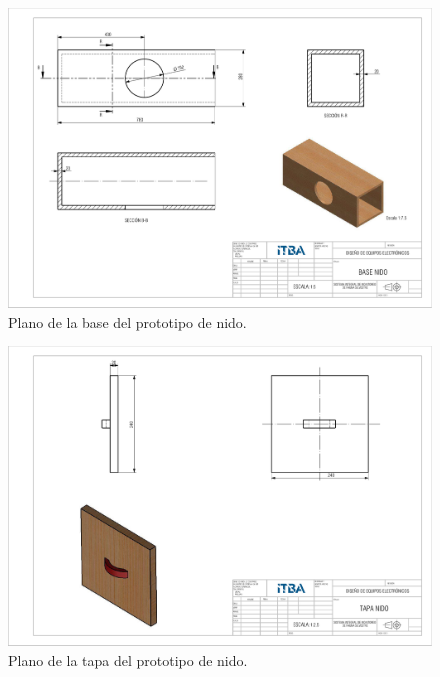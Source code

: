 \begin{figure}[H]
	\centering
	\includegraphics[width=\linewidth]{ImagenesApendice/Base_nido_plano}
	\caption{Plano de la base del prototipo de nido.}
	\label{fig:base_nido_plano}
\end{figure}


\begin{figure}[H]
	\centering
	\includegraphics[width=0.9\linewidth]{ImagenesApendice/tapa_nido_plano}
	\caption{Plano de la tapa del prototipo de nido.}
	\label{fig:tapa_nido_plano}
\end{figure}

